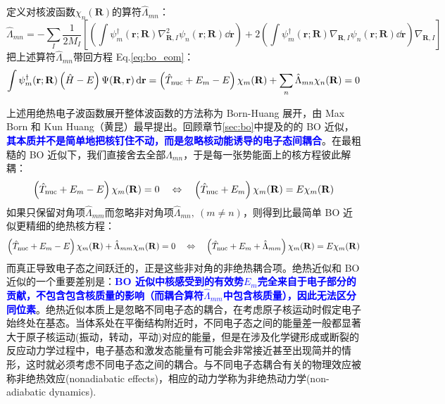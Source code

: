 定义对核波函数$\chi_n(\mathbf{R})$的算符$\hat{\Lambda}_{mn}$：
\begin{equation}\label{eq:na_coupling}
\hat{\Lambda}_{mn}=-\sum_I\frac{1}{2M_I}\left[\left(\int\psi_m^{\dagger}(\mathbf{r};\mathbf{R})\nabla_{\mathbf{R},I}^2\psi_n(\mathbf{r};\mathbf{R})\dd{\mathbf{r}}\right)+2\left(\int\psi_m^{\dagger}(\mathbf{r};\mathbf{R})\nabla_{\mathbf{R},I}\psi_n(\mathbf{r};\mathbf{R})\dd{\mathbf{r}}\right)\nabla_{\mathbf{R},I}\right]
\end{equation}
把上述算符$\hat{\Lambda}_{mn}$带回方程 Eq.\eqref{eq:bo_eom}：
\begin{equation}\label{eq:bh_expansion}
\int\psi_m^{\dagger}(\mathbf{r};\mathbf{R})\left(\hat{H}-E\right)\Psi(\mathbf{R},\mathbf{r})\dd{\mathbf{r}}
=\left(\hat{T}_{\rm nuc}+E_m-E\right)\chi_m(\mathbf{R})+\sum_n\hat{\Lambda}_{mn}\chi_n(\mathbf{R})=0
\end{equation}

上述用绝热电子波函数展开整体波函数的方法称为 Born-Huang 展开，由 Max Born 和 Kun Huang（黄昆）最早提出。回顾章节\ref{sec:bo}中提及的的 BO 近似，\textcolor{blue}{\textbf{其本质并不是简单地把核钉住不动，而是忽略核动能诱导的电子态间耦合}}。在最粗糙的 BO 近似下，我们直接舍去全部$\hat{\Lambda}_{mn}$，于是每一张势能面上的核方程彼此解耦：
\[\left(\hat{T}_{\rm nuc}+E_m-E\right)\chi_m(\mathbf{R})=0 \quad \Leftrightarrow \quad \left(\hat{T}_{\rm nuc}+E_m\right)\chi_m(\mathbf{R})=E\chi_m(\mathbf{R})\]
如果只保留对角项$\hat{\Lambda}_{mm}$而忽略非对角项$\hat{\Lambda}_{mn}, \ (m \neq n)$，则得到比最简单 BO 近似更精细的绝热核方程：
\[\left(\hat{T}_{\rm nuc}+E_m-E\right)\chi_m(\mathbf{R})+\hat{\Lambda}_{mm}\chi_m(\mathbf{R})=0 \quad \Leftrightarrow \quad \left(\hat{T}_{\rm nuc}+E_m+\hat{\Lambda}_{mm}\right)\chi_m(\mathbf{R})=E\chi_m(\mathbf{R})\]
而真正导致电子态之间跃迁的，正是这些非对角的非绝热耦合项。绝热近似和 BO 近似的一个重要差别是：\textcolor{blue}{\textbf{BO 近似中核感受到的有效势$E_m$完全来自于电子部分的贡献，不包含包含核质量的影响（而耦合算符$\hat{\Lambda}_{mm}$中包含核质量），因此无法区分同位素}}。绝热近似本质上是忽略不同电子态的耦合，在考虑原子核运动时假定电子始终处在基态。当体系处在平衡结构附近时，不同电子态之间的能量差一般都显著大于原子核运动(振动，转动，平动)对应的能量，但是在涉及化学键形成或断裂的反应动力学过程中，电子基态和激发态能量有可能会非常接近甚至出现简并的情形，这时就必须考虑不同电子态之间的耦合。与不同电子态耦合有关的物理效应被称非绝热效应(nonadiabatic effects)，相应的动力学称为非绝热动力学(non-adiabatic dynamics).

\newpage
